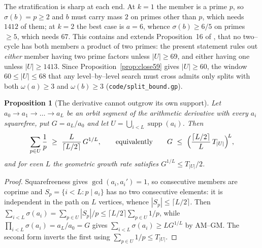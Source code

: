 \documentclass[11pt]{article}
\newtheorem{proposition}[theorem]{Proposition}
\theoremstyle{definition}
\begin{document}
The stratification is sharp at each end. At $k=1$ the member is a prime $p$, so $\sigma(b)=p\ge2$ and
$b$ must carry mass $2$ on primes other than $p$, which needs $1412$ of them; at $k=2$ the best case
is $a=6$, whence $\sigma(b)\ge6/5$ on primes $\ge5$, which needs $67$. This contains and extends
Proposition~16 of \cite{Kovic2012}, that no two--cycle has both members a product of two primes: the
present statement rules out \emph{either} member having two prime factors unless $|U|\ge69$, and
either having one unless $|U|\ge1413$. Since Proposition~\ref{prop:close59} gives $|U|\ge60$, the
window $60\le|U|\le68$ that any level--by--level search must cross admits only splits with both
$\omega(a)\ge3$ and $\omega(b)\ge3$ \textup{(\texttt{code/split\_bound.gp})}.

\begin{proposition}[The derivative cannot outgrow its own support]\label{prop:growth}
Let $a_0\to a_1\to\dots\to a_L$ be an orbit segment of the arithmetic derivative with every $a_i$
squarefree, put $G=a_L/a_0$ and let $U=\bigcup_{i<L}\operatorname{supp}(a_i)$. Then
\[ \sum_{p\in U}\frac1p\ \ge\ \frac{L}{\lceil L/2\rceil}\,G^{1/L},
\qquad\text{equivalently}\qquad
G\ \le\ \Bigl(\frac{\lceil L/2\rceil}{L}\,T_{|U|}\Bigr)^{\!L}, \]
and for even $L$ the geometric growth rate satisfies $G^{1/L}\le T_{|U|}/2$.
\end{proposition}
\begin{proof}
Squarefreeness gives $\gcd(a_i,a_i')=1$, so consecutive members are coprime and
$S_p=\{i<L:p\mid a_i\}$ has no two consecutive elements: it is independent in the path on $L$
vertices, whence $|S_p|\le\lceil L/2\rceil$. Then $\sum_{i<L}\sigma(a_i)=\sum_{p\in U}|S_p|/p\le
\lceil L/2\rceil\sum_{p\in U}1/p$, while $\prod_{i<L}\sigma(a_i)=a_L/a_0=G$ gives
$\sum_{i<L}\sigma(a_i)\ge LG^{1/L}$ by AM--GM. The second form inverts the first using
$\sum_{p\in U}1/p\le T_{|U|}$.
\end{proof}
\end{document}
